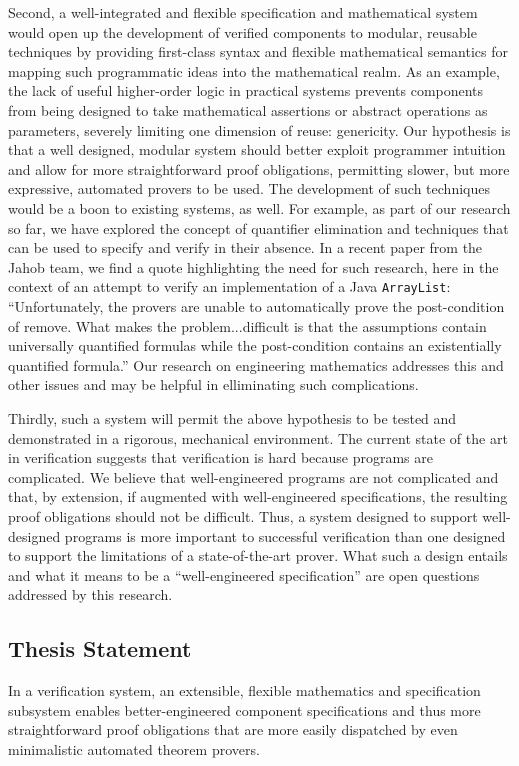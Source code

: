 Second, a well-integrated and flexible specification and mathematical system would open up the development of verified components to modular, reusable techniques by providing first-class syntax and flexible mathematical semantics for mapping such programmatic ideas into the mathematical realm.  As an example, the lack of useful higher-order logic in practical systems prevents components from being designed to take mathematical assertions or abstract operations as parameters, severely limiting one dimension of reuse: genericity\cite{bronishMap}.  Our hypothesis is that a well designed, modular system should better exploit programmer intuition and allow for more straightforward proof obligations, permitting slower, but more expressive, automated provers to be used.  The development of such techniques would be a boon to existing systems, as well.  For example, as part of our research so far, we have explored the concept of quantifier elimination and techniques that can be used to specify and verify in their absence.  In a recent paper from the Jahob team, we find a quote highlighting the need for such research, here in the context of an attempt to verify an implementation of a Java \texttt{ArrayList}: ``Unfortunately, the provers are unable to automatically prove the post-condition of remove.  What makes the problem...difficult is that the assumptions contain universally quantified formulas while the post-condition contains an existentially quantified formula.''  Our research on engineering mathematics addresses this and other issues and may be helpful in elliminating such complications.

Thirdly, such a system will permit the above hypothesis to be tested and demonstrated in a rigorous, mechanical environment.  The current state of the art in verification suggests that verification is hard because programs are complicated.  We believe that well-engineered programs are not complicated and that, by extension, if augmented with well-engineered specifications, the resulting proof obligations should not be difficult.  Thus, a system designed to support well-designed programs is more important to successful verification than one designed to support the limitations of a state-of-the-art prover.  What such a design entails and what it means to be a ``well-engineered specification'' are open questions addressed by this research.

\subsection{Thesis Statement}
In a verification system, an extensible, flexible mathematics and specification subsystem enables better-engineered component specifications and thus more straightforward proof obligations that are more easily dispatched by even minimalistic automated theorem provers.

